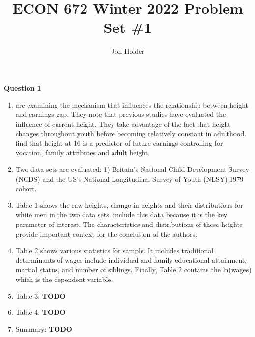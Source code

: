 \documentclass[12pt]{article}
\begin{document}
\title{ECON 672 Winter 2022 Problem Set \#1}
\author{Jon Holder}

\newcommand{\question}[1]{\textbf{\noindent Question #1}}
\newcommand{\tabindent}{\hspace{3mm}}

\newcommand{\todo}{\textbf{TODO}}

\maketitle
\question{1}
    \begin{enumerate}[\indent a.]
        \item \textcite{Persico2004} are examining the mechanism that 
        influences the relationship between height and earnings gap. They note 
        that previous studies have evaluated the influence of current height.  
        They take advantage of the fact that height changes throughout youth 
        before becoming relatively constant in adulthood. 
        \citeauthor{Persico2004} find that height at 16 is a predictor of 
        future earnings controlling for vocation, family attributes and adult 
        height.
        
        \item Two data sets are evaluated: 1) Britain's National Child 
        Development Survey (NCDS) and the US's National Longitudinal Survey of 
        Youth (NLSY) 1979 cohort.

        \item Table 1 shows the raw heights, change in heights and their 
        distributions for white men in the two data sets. 
        \citeauthor{Persico2004} include this data because it is the key 
        parameter of interest.  The characteristics and distributions of these 
        heights provide important context for the conclusion of the authors.

        \item Table 2 shows various statistics for sample.  It includes 
        traditional determinants of wages include individual and family 
        educational attainment, martial status, and number of siblings. Finally, 
        Table 2 contains the ln(wages) which is the dependent variable.

        \item Table 3: \todo
        
        \item Table 4: \todo
        
        \item Summary: \todo
    \end{enumerate}
\end{document}
